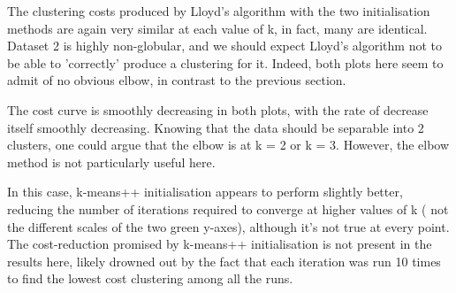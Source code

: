 \documentclass[12pt]{article}
\begin{document}
The clustering costs produced by Lloyd's algorithm with the two initialisation
methods are again very similar at each value of k, in fact, many are identical. 
Dataset 2 is highly non-globular, and we should expect Lloyd's algorithm not to 
be able to 'correctly' produce a clustering for it. Indeed, both plots here seem
to admit of no obvious elbow, in contrast to the previous section.

The cost curve is smoothly decreasing in both plots, with the rate of decrease
itself smoothly decreasing. Knowing that the data should be separable into
2 clusters, one could argue that the elbow is at k = 2 or k = 3. However, the
elbow method is not particularly useful here.

In this case, k-means++ initialisation appears to perform slightly better,
reducing the number of iterations required to converge at higher values of k (
not the different scales of the two green y-axes), although it's not true at
every point. The cost-reduction promised by k-means++ initialisation is not
present in the results here, likely drowned out by the fact that each iteration
was run 10 times to find the lowest cost clustering among all the runs.
\end{document}
